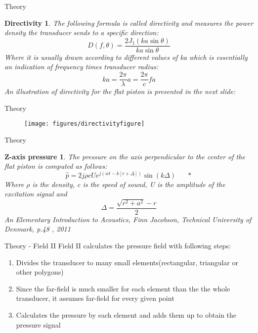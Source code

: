 \documentclass{beamer}
\begin{document}
\begin{frame}{Theory}
\newtheorem{directivity}{Directivity}
\begin{directivity}
The following formula is called directivity and measures the power density the transducer sends to a specific direction:
$$D(f,\theta)=\frac{2J_1(ka\sin\theta)}{ka\sin\theta}$$
Where it is usually drawn according to different values of ka which is essentially an indication of frequency times transducer radius:
$$ka=\frac{2\pi}{\lambda}a=\frac{2\pi}{c}fa$$
An illustration of directivity for the flat piston is presented in the next slide:
\end{directivity}
\end{frame}



\begin{frame}{Theory}
\begin{figure}
\texttt{[image: figures/directivityfigure]}
\end{figure}
\end{frame}

\begin{frame}{Theory}
\newtheorem{zaxis}{Z-axis pressure}
\begin{zaxis}
The pressure on the axis perpendicular to the center of the flat piston is computed as follows:
$$\hat{p}=2j\rho cUe^{j(wt-k[r+\Delta])}\sin (k\Delta)\ \ \  \ \ \ \     *$$
Where $\rho$ is the density, c is the speed of sound, U is the amplitude of the excitation signal and 
$$\Delta = \frac{\sqrt{r^2+a^2}-r}{2}$$
{\tiny * An Elementary Introduction to Acoustics, Finn Jacobson, Technical University of Denmark, p.48	, 2011} 
\end{zaxis}
\end{frame}
\begin{frame}{Theory - Field II}
Field II calculates the pressure field with following steps:
\begin{enumerate}
\item Divides the transducer to many small elements(rectangular, triangular or other polygons)
\item Since the far-field is much smaller for each element than the the whole transducer, it assumes far-field for every given point
\item Calculates the pressure by each element and adds them up to obtain the pressure signal
\end{enumerate}
\end{frame}
\end{document}
